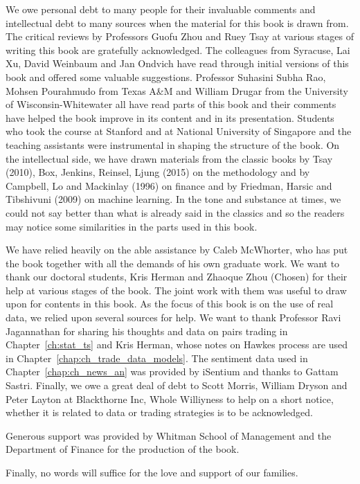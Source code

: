 We owe personal debt to many people for their invaluable comments and intellectual debt to many sources when the material for this book is drawn from. The critical reviews by Professors Guofu Zhou and Ruey Tsay at various stages of writing this book are gratefully acknowledged. The colleagues from Syracuse, Lai Xu, David Weinbaum and Jan Ondvich have read through initial versions of this book and offered some valuable suggestions. Professor Suhasini Subha Rao, Mohsen Pourahmudo from Texas A\&M and William Drugar from the University of Wisconsin-Whitewater all have read parts of this book and their comments have helped the book improve in its content and in its presentation. Students who took the course at Stanford and at National University of Singapore and the teaching assistants were instrumental in shaping the structure of the book. On the intellectual side, we have drawn materials from the classic books by Tsay (2010), Box, Jenkins, Reinsel, Ljung (2015) on the methodology and by Campbell, Lo and Mackinlay (1996) on finance and by Friedman, Harsic and Tibshivuni (2009) on machine learning. In the tone and substance at times, we could not say better than what is already said in the classics and so the readers may notice some similarities in the parts used in this book. 


We have relied heavily on the able assistance by Caleb McWhorter, who has put the book together with all the demands of his own graduate work. We want to thank our doctoral students, Kris Herman and Zhaoque Zhou (Chosen) for their help at various stages of the book. The joint work with them was useful to draw upon for contents in this book. As the focus of this book is on the use of real data, we relied upon several sources for help. We want to thank Professor Ravi Jagannathan for sharing his thoughts and data on pairs trading in Chapter~\ref{ch:stat_ts} and Kris Herman, whose notes on Hawkes process are used in Chapter~\ref{chap:ch_trade_data_models}. The sentiment data used in Chapter~\ref{chap:ch_news_an} was provided by iSentium and thanks to Gattam Sastri. Finally, we owe a great deal of debt to Scott Morris, William Dryson and Peter Layton at Blackthorne Inc, Whole Williyness to help on a short notice, whether it is related to data or trading strategies is to be acknowledged. 


Generous support was provided by Whitman School of Management and the Department of Finance for the production of the book. 


Finally, no words will suffice for the love and support of our families. \vspace{3\baselineskip}


